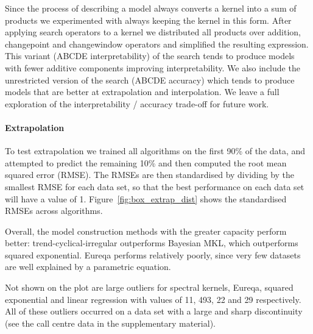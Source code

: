 \documentclass[letterpaper]{article}
\newcommand{\procedurename}{ABCDE}
\begin{document}
Since the process of describing a model always converts a kernel into a sum of products we experimented with always keeping the kernel in this form.
After applying search operators to a kernel we distributed all products over addition, changepoint and changewindow operators and simplified the resulting expression.
This variant (\procedurename{} interpretability) of the search tends to produce models with fewer additive components improving interpretability.
We also include the unrestricted version of the search (\procedurename{} accuracy) which tends to produce models that are better at extrapolation and interpolation.
%
We leave a full exploration of the interpretability / accuracy trade-off for future work.

\paragraph{Extrapolation}

To test extrapolation we trained all algorithms on the first 90\% of the data, and attempted to predict the remaining 10\% and then computed the root mean squared error (RMSE).
The RMSEs are then standardised by dividing by the smallest RMSE for each data set, so that the best performance on each data set will have a value of 1.
%
Figure~\ref{fig:box_extrap_dist} shows the standardised RMSEs across algorithms.

Overall, the model construction methods with the greater capacity perform better: trend-cyclical-irregular outperforms Bayesian MKL, which outperforms squared exponential.
Eureqa performs relatively poorly, since very few datasets are well explained by a parametric equation.

Not shown on the plot are large outliers for spectral kernels, Eureqa, squared exponential and linear regression with values of 11, 493, 22 and 29 respectively.
All of these outliers occurred on a data set with a large and sharp discontinuity (see the call centre data in the supplementary material).

\end{document}

